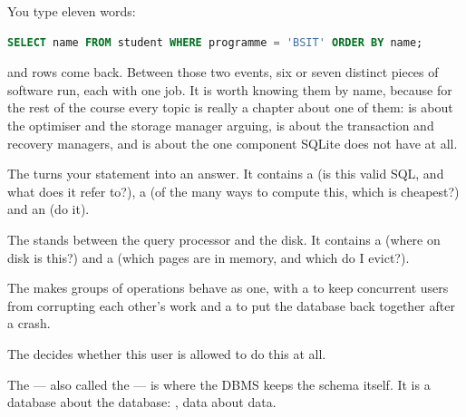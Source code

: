 You type eleven words:

\begin{lstlisting}[language=sql]
SELECT name FROM student WHERE programme = 'BSIT' ORDER BY name;
\end{lstlisting}

and rows come back. Between those two events, six or seven distinct pieces of
software run, each with one job. It is worth knowing them by name, because for
the rest of the course every topic is really a chapter about one of them:
 is about the optimiser and the storage manager arguing,
 is about the transaction and recovery managers, and
 is about the one component SQLite does not have at all.

\begin{definitionbox}
The  turns your statement into an answer. It contains a
 (is this valid SQL, and what does it refer to?), a
 (of the many ways to compute this, which is cheapest?)
and an  (do it).

\smallskip
The  stands between the query processor and the disk. It
contains a  (where on disk is this?) and a
 (which pages are in memory, and which do I evict?).

\smallskip
The  makes groups of operations behave as one, with
a  to keep concurrent users from corrupting each other's
work and a  to put the database back together after a
crash.

\smallskip
The  decides whether this user is allowed to do
this at all.

\smallskip
The  --- also called the  --- is
where the DBMS keeps the schema itself. It is a database about the database:
, data about data.
\end{definitionbox}

